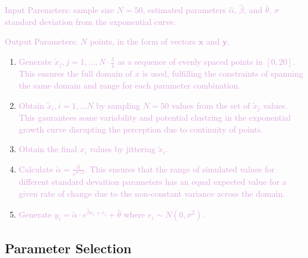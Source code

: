 \documentclass[]{interact}
\theoremstyle{plain}%
\theoremstyle{definition}
\theoremstyle{remark}
\begin{document}
\textcolor{Plum}{Input Paremeters: sample size $N = 50$, estimated parameters $\hat\alpha$, $\hat\beta$, and $\hat\theta$, $\sigma$ standard deviation from the exponential curve.}

\textcolor{Plum}{Output Parameters: $N$ points, in the form of vectors $\mathbf{x}$ and $\mathbf{y}$.}

\begin{enumerate}
\def\labelenumi{\arabic{enumi}.}
\item
  \textcolor{Plum}{Generate $\tilde x_j, j = 1,..., N\cdot \frac{3}{4}$ as a sequence of evenly spaced points in $[0,20]$. This ensures the full domain of $x$ is used, fulfilling the constraints of spanning the same domain and range for each parameter combination.}
\item
  \textcolor{Plum}{Obtain $\tilde x_i, i = 1,...N$ by sampling $N = 50$ values from the set of $\tilde x_j$ values. This gaurantees some variability and potential clustring in the exponential growth curve disrupting the perception due to continuity of points.}
\item
  \textcolor{Plum}{Obtain the final $x_i$ values by jittering $\tilde x_i$.}
\item
  \textcolor{Plum}{Calculate $\tilde\alpha = \frac{\hat\alpha}{e^{\sigma^2/2}}.$ This ensures that the range of simulated values for different standard devaition parameters has an equal expected value for a given rate of change due to the non-constant variance across the domain.}
\item
  \textcolor{Plum}{Generate $y_i = \tilde\alpha\cdot e^{\hat\beta x_i + e_i}+\hat\theta$ where $e_i\sim N(0,\sigma^2).$}
\end{enumerate}

\hypertarget{parameter-selection}{%
\subsection{Parameter Selection}\label{parameter-selection}}
\end{document}
